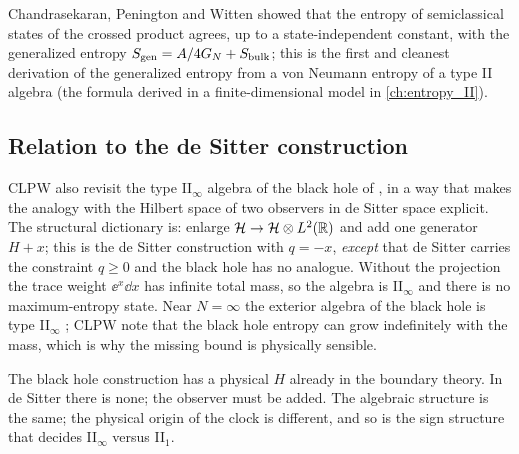 Chandrasekaran, Penington and Witten \cite{CPW2022} showed that the entropy of semiclassical states of the crossed product agrees, up to a state-independent constant, with the generalized entropy $S_{\mathrm{gen}}=A/4G_N+S_{\rm bulk}$; this is the first and cleanest derivation of the generalized entropy from a von Neumann entropy of a type II algebra (the formula derived in a finite-dimensional model in \cref{ch:entropy_II}).

\begin{center}
\renewcommand{\arraystretch}{1.3}
\end{center}

\subsection{Relation to the de Sitter construction}
CLPW also revisit the type II$_\infty$ algebra of the black hole of \cite{CPW2022}, in a way that makes the analogy with the Hilbert space of two observers in de Sitter space explicit. The structural dictionary is: enlarge $\mathcal{H}\to\mathcal{H}\otimes L^2(\mathbb{R})$ and add one generator $H+x$; this is the de Sitter construction with $q=-x$, \emph{except} that de Sitter carries the constraint $q\ge0$ and the black hole has no analogue. Without the projection the trace weight $\ee^{x}\dd x$ has infinite total mass, so the algebra is II$_\infty$ and there is no maximum-entropy state. Near $N=\infty$ the exterior algebra of the black hole is type II$_\infty$ \cite{CPW2022}; CLPW note that the black hole entropy can grow indefinitely with the mass, which is why the missing bound is physically sensible.

\begin{whatwrong}
The black hole construction has a physical $H$ already in the boundary theory. In de Sitter there is none; the observer must be added. The algebraic structure is the same; the physical origin of the clock is different, and so is the sign structure that decides II$_\infty$ versus II$_1$.
\end{whatwrong}

